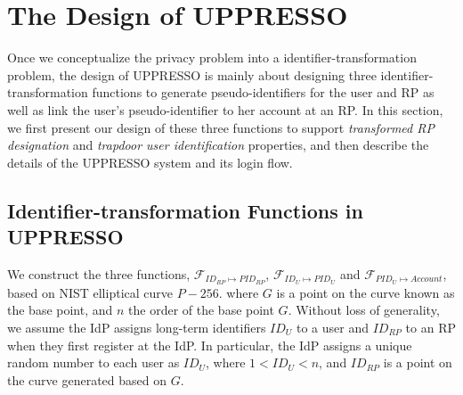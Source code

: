 \section{The Design of UPPRESSO}
\label{sec:UPPRESSO}

Once we conceptualize the privacy problem into a identifier-transformation problem, the design of UPPRESSO is mainly about designing three identifier-transformation functions to generate pseudo-identifiers for the user and RP as well as link the user's pseudo-identifier to her account at an RP. In this section, we first present our design of these three functions to support {\em transformed RP designation} and {\em trapdoor user identification} properties, and then describe the details of the UPPRESSO system and its login flow.


\subsection{Identifier-transformation Functions in UPPRESSO}
\label{subsec:overview}


We construct the three functions, $\mathcal{F}_{ID_{RP} \mapsto PID_{RP}}$, $\mathcal{F}_{ID_{U} \mapsto PID_{U}}$ and $\mathcal{F}_{PID_{U} \mapsto Account}$, based on NIST elliptical curve $P-256$.
where 
$G$ is a point on the curve known as the base point, 
and $n$ the order of the base point $G$. %
Without loss of generality, we assume the IdP assigns long-term identifiers $ID_U$ to a user and $ID_{RP}$ to an RP when they first register at the IdP. In particular, the IdP assigns a unique random number to each user as $ID_U$, where $1<ID_U<n$, and $ID_{RP}$ is a point on the curve generated based on $G$.%

